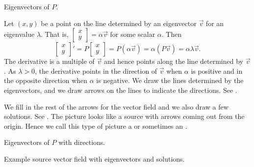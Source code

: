 \begin{mywrapfig}[14]{3.25in}
\capstart
{}
\caption{Eigenvectors of $P$.\label{pln:source-eigfig}}
\end{mywrapfig}

Let $(x,y)$ be a point on the line determined by an eigenvector
$\vec{v}$ for an eigenvalue $\lambda$.
That is,
$\left[ \begin{smallmatrix} x \\ y \end{smallmatrix} \right] = \alpha \vec{v}$
for some scalar $\alpha$.
Then 
\begin{equation*}
\begin{bmatrix} x \\ y \end{bmatrix} '
=
P \begin{bmatrix} x \\ y \end{bmatrix}
=
P ( \alpha \vec{v} ) =  \alpha ( P \vec{v} )
= \alpha \lambda \vec{v} .
\end{equation*}
The derivative is a multiple of $\vec{v}$ and hence points along the
line determined by $\vec{v}$.  As $\lambda > 0$, the derivative points in the
direction of $\vec{v}$ when $\alpha$ is positive and in the opposite direction
when $\alpha$ is negative.  We draw the lines determined by
the eigenvectors, and we draw
arrows on the lines to indicate the directions.
See .

We fill in the rest of the arrows for the vector field
and we also draw a few solutions.  See
.
The picture looks like a source
with arrows coming out from the origin.
Hence we call this type of picture a
\emph{} or sometimes an \emph{}.

\begin{myfig}
\parbox[t]{3.0in}{
 \capstart
 \caption{Eigenvectors of $P$ with directions.\label{pln:source-eig-arrfig}}
}
\quad
\parbox[t]{3.0in}{
 \capstart
 \caption{Example source vector field with eigenvectors and
 solutions.\label{pln:source-fullfig}}
}
\end{myfig}

\medskip

